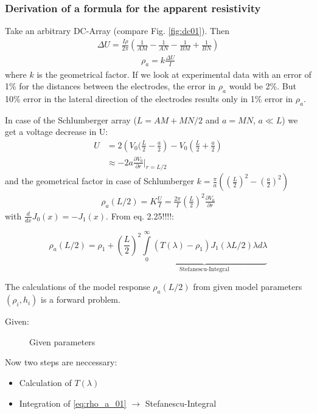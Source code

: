 \subsubsection{Derivation of a formula for the apparent resistivity}
Take an arbitrary DC-Array (compare Fig. \ref{fig:dc01}). Then
\begin{align*}
\Delta U=\frac{I\rho}{2\pi}\left(\frac{1}{AM}-\frac{1}{AN}-\frac{1}{BM}+\frac{1}{BN}\right)
\end{align*}
\begin{align*}
\rho_a=k\frac{\Delta U}{I}
\end{align*}
where $k$ is the geometrical factor.
If we look at experimental data with an error of 1\% for the distances between the electrodes, the error in $\rho_a$ would be 2\%. But 10\% error in the lateral direction of the electrodes results only in 1\% error in $\rho_a$.

In case of the Schlumberger array ($L=AM+MN/2$ and $a=MN$, $a\ll L$) we get a voltage decrease in U:
\begin{align*}
U&=2\left(V_0(\frac{L}{2}-\frac{a}{2}\right)-V_0\left(\frac{L}{2}+\frac{a}{2}\right)\\
&\approx -2a\frac{\partial V_0}{\partial r}\bigg|_{r=L/2}
\end{align*}
and the geometrical factor in case of Schlumberger $k=\frac{\pi}{a}\left(\left(\frac{L}{2}\right)^2-\left(\frac{a}{2}\right)^2\right)$
\begin{align*}
\rho_a(L/2)=K\frac{U}{I}=\frac{2\pi}{I}\left(\frac{L}{2}\right)^2\frac{\partial V_0}{\partial r}
\end{align*}
with $\frac{d}{dx}J_0(x)=-J_1(x)$. From eq. 2.25!!!!:

\begin{equation}
\rho_a(L/2)=\rho_1+\left(\frac{L}{2}\right)^2\underbrace{\int\limits_{0}^{\infty}(T(\lambda)-\rho_1)J_1(\lambda L/2)\lambda d\lambda}_{\textrm{Stefanescu-Integral}} \label{eq:rho_a_01}
\end{equation}

The calculations of the model response $\rho_a(L/2)$ from given model parameters $(\rho_i,h_i)$ is a forward problem. 

Given:
\begin{figure}[H]
\begin{center}
\caption{Given parameters}
\label{fig:forwardgiven}
\end{center}
\end{figure}

Now two steps are neccessary:
\begin{itemize}
\item Calculation of $T(\lambda)$
\item Integration of \eqref{eq:rho_a_01} $\rightarrow$ Stefanescu-Integral
\end{itemize}

